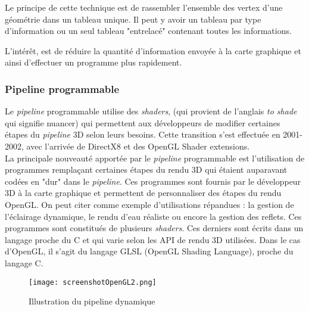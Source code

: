 \documentclass[11pt]{report}
\begin{document}
	Le principe de cette technique est de rassembler l'ensemble des vertex d'une géométrie dans un tableau unique. Il peut y avoir un tableau par type d'information ou un seul tableau "entrelacé" contenant toutes les informations.

L'intérêt, est de réduire la quantité d'information envoyée à la carte graphique et ainsi d'effectuer un programme plus rapidement. \cite{vbo}

\subsubsection{Pipeline programmable} %




Le \textit{pipeline} programmable utilise des \textit{shaders}, (qui provient de l'anglais \textit{to shade} qui signifie nuancer) qui permettent aux développeurs de modifier certaines étapes du \textit{pipeline} 3D selon leurs besoins. Cette transition s'est effectuée en 2001-2002, avec l'arrivée de DirectX8 et des OpenGL Shader extensions.
\\ 

La principale nouveauté apportée par le \textit{pipeline} programmable est l'utilisation de programmes remplaçant certaines étapes du rendu 3D qui étaient auparavant codées en "dur" dans le \textit{pipeline}. Ces programmes sont fournis par le développeur 3D à la carte graphique et permettent de personnaliser des étapes du rendu OpenGL. On peut citer comme exemple d'utilisations répandues : la gestion de l'éclairage dynamique, le rendu d'eau réaliste ou encore la gestion des reflets. Ces programmes sont constitués de plusieurs \textit{shaders}. Ces derniers sont écrits dans un langage proche du C et qui varie selon les API de rendu 3D utilisées. Dans le cas d'OpenGL, il s'agit du langage GLSL (OpenGL Shading Language), proche du langage C.



\begin{figure}[h!]
  \caption{Illustration du pipeline dynamique\cite{screenshotOpenGL2}}
  \centering
    \texttt{[image: screenshotOpenGL2.png]}
    \label{PipelineP}
\end{figure}
 
\end{document}
